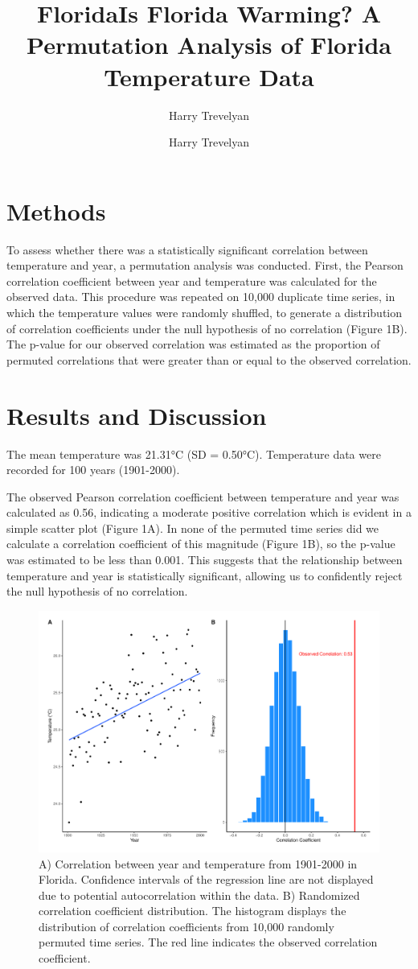 \documentclass{article}
\title{Florida}
\author{Harry Trevelyan}
\date{}
\title{Is Florida Warming? A Permutation Analysis of Florida Temperature Data}
\author{Harry Trevelyan}
\date{} %
\begin{document}
\maketitle

\section*{Methods}
To assess whether there was a statistically significant correlation between temperature and year, a permutation analysis was conducted. First, the Pearson correlation coefficient between year and temperature was calculated for the observed data. This procedure was repeated on 10,000 duplicate time series, in which the temperature values were randomly shuffled, to generate a distribution of correlation coefficients under the null hypothesis of no correlation (Figure 1B). The p-value for our observed correlation was estimated as the proportion of permuted correlations that were greater than or equal to the observed correlation.

\section*{Results and Discussion}
The mean temperature was 21.31°C (SD = 0.50°C). Temperature data were recorded for 100 years (1901-2000).

The observed Pearson correlation coefficient between temperature and year was calculated as 0.56, indicating a moderate positive correlation which is evident in a simple scatter plot (Figure 1A). In none of the permuted time series did we calculate a correlation coefficient of this magnitude (Figure 1B), so the p-value was estimated to be less than 0.001. This suggests that the relationship between temperature and year is statistically significant, allowing us to confidently reject the null hypothesis of no correlation.


\begin{figure}[ht]
    \centering
    \includegraphics[height = 0.6\textwidth]{../results/Florida_plots.pdf}
    \caption{ A) Correlation between year and temperature from 1901-2000 in Florida. Confidence intervals of the regression line are not displayed due to potential autocorrelation within the data. B) Randomized correlation coefficient distribution. The histogram displays the distribution of correlation coefficients from 10,000 randomly permuted time series. The red line indicates the observed correlation coefficient. }
    \label{fig:floridaplots}
\end{figure}
\end{document}
